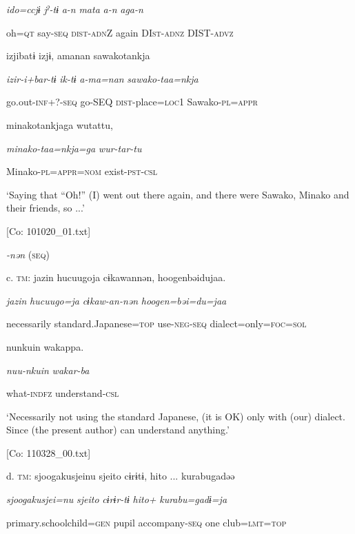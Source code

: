       \textit{ido=ccjɨ}  \textit{jˀ-tɨ}  \textit{a-n}  \textit{mata}  \textit{a-n}  \textit{aga-n}

      oh=\textsc{qt}  say-\textsc{seq}  \textsc{dist}-\textsc{adn}Z  again  DI\textsc{st}-\textsc{adnz}  DIST-\textsc{advz}

      izjibatɨ  izjɨ,  amanan  sawakotankja

      \textit{izir-i+bar-tɨ}  \textit{ik-tɨ}  \textit{a-ma=nan}  \textit{sawako-taa=nkja}

      go.out-\textsc{inf}+?-\textsc{seq}  go-SEQ  \textsc{dist}-place=\textsc{loc}1  Sawako-\textsc{pl}=\textsc{appr}

      minakotankjaga  wutattu,

      \textit{minako-taa=nkja=ga}  \textit{wur-tar-tu}

      Minako-\textsc{pl}=\textsc{appr}=\textsc{nom}  exist-\textsc{pst}-\textsc{csl}

      ‘Saying that “Oh!” (I) went out there again, and there were Sawako, Minako and their friends, so ...’

      [Co: 101020\_01.txt]

  \textit{{}-nən} (\textsc{seq})

  c.  \textsc{tm}:  jazin  {\textbar}hucuugo{\textbar}ja  cɨkawannən,  {\textbar}hoogen{\textbar}bəidujaa.

      \textit{jazin}  \textit{hucuugo=ja}  \textit{cɨkaw-an-nən}  \textit{hoogen=bəi=du=jaa}

      necessarily  standard.Japanese=\textsc{top}  use-\textsc{neg}-\textsc{seq}  dialect=only=\textsc{foc}=\textsc{sol}

      nunkuin  wakappa.

      \textit{nuu-nkuin}  \textit{wakar-ba}

      what-\textsc{indfz}  understand-\textsc{csl}

      ‘Necessarily not using the standard Japanese, (it is OK) only with (our) dialect. Since (the present author) can understand anything.’

      [Co: 110328\_00.txt]

  d.  \textsc{tm}:  {\textbar}sjoogakusjei{\textbar}nu  {\textbar}sjeito{\textbar}  cɨrɨtɨ,  {\textbar}hito ...  kurabu{\textbar}gadəə

      \textit{sjoogakusjei=nu}  \textit{sjeito}  \textit{cɨrɨr-tɨ}  \textit{hito+}  \textit{kurabu=gadɨ=ja}

      primary.schoolchild=\textsc{gen}  pupil  accompany-\textsc{seq}  one  club=\textsc{lmt}=\textsc{top}

